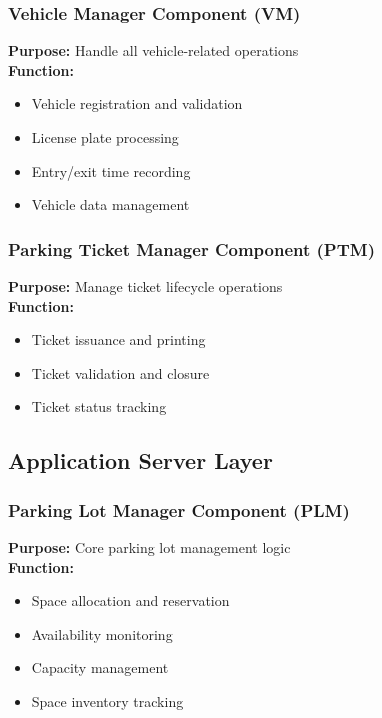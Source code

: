     \subsubsection{Vehicle Manager Component (VM)}
        \textbf{Purpose:} Handle all vehicle-related operations\\
        \textbf{Function:}

        \begin{itemize}
            \item Vehicle registration and validation
            \item License plate processing
            \item Entry/exit time recording
            \item Vehicle data management
        \end{itemize}

    \subsubsection{Parking Ticket Manager Component (PTM)}
        \textbf{Purpose:} Manage ticket lifecycle operations\\
        \textbf{Function:}
        \begin{itemize}
            \item Ticket issuance and printing
            \item Ticket validation and closure
            \item Ticket status tracking
        \end{itemize}

\subsection{Application Server Layer}

\subsubsection{Parking Lot Manager Component (PLM)}
    \textbf{Purpose:} Core parking lot management logic\\
    \textbf{Function:}

    \begin{itemize}
        \item Space allocation and reservation
        \item Availability monitoring
        \item Capacity management
        \item Space inventory tracking
    \end{itemize}
